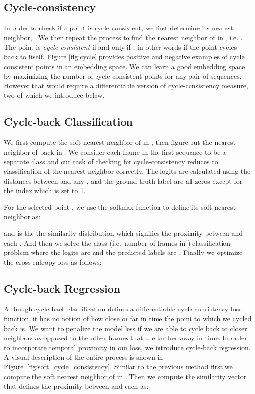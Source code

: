 \documentclass[10pt,twocolumn,letterpaper]{article}
\begin{document}
\subsection{Cycle-consistency}
\label{sec:cycle_consistency}
In order to check if a point  is cycle consistent, we first determine its nearest neighbor, . We then repeat the process to find the nearest neighbor of  in , i.e. . The point  is \emph{cycle-consistent} if and only if , in other words if the point  cycles back to itself.
Figure \ref{fig:cycle} provides positive and negative examples of cycle consistent points in an embedding space.
We can learn a good embedding space by maximizing the number of cycle-consistent points for any pair of sequences. However that would require a differentiable version of cycle-consistency measure, two of which we introduce below.

\subsection{Cycle-back Classification}

We first compute the soft nearest neighbor  of  in , then figure out the nearest neighbor of  back in . We consider each frame in the first sequence  to be a separate class and our task of checking for cycle-consistency reduces to classification of the nearest neighbor correctly. The logits are calculated using the distances between  and any , and the ground truth label  are all zeros except for the  index which is set to 1.  

For the selected point , we use the softmax function to define its soft nearest neighbor  as:
 
and  is the the similarity distribution which signifies the proximity between  and each . And then we solve the  class (i.e.\ number of frames in ) classification problem where the logits are  and the predicted labels are . Finally we optimize the cross-entropy loss as follows:


\subsection{Cycle-back Regression}

Although cycle-back classification defines a differentiable cycle-consistency loss function, it has no notion of how close or far in time the point to which we cycled back is. We want to penalize the model less if we are able to cycle back to closer neighbors as opposed to the other frames that are farther away in time. In order to incorporate temporal proximity in our loss, we introduce cycle-back regression. A visual description of the entire process is shown in Figure~\ref{fig:soft_cycle_consistency}. Similar to the previous method first we compute the soft nearest neighbor  of  in . Then we compute the similarity vector  that defines the proximity between  and each  as:
\end{document}
